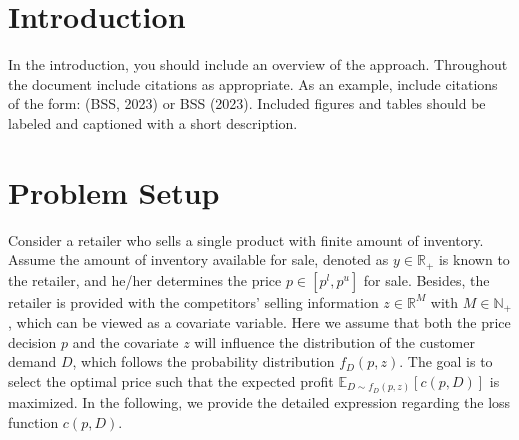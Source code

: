 \documentclass[competition,nonblindrev]{informs3-competition}
\begin{document}







\maketitle

\section{Introduction}

In the introduction, you should include an overview of the approach. Throughout the document include citations as appropriate. As an example, include citations of the form: (BSS, 2023) or BSS (2023). Included figures and tables should be labeled and captioned with a short description.



\section{Problem Setup}
Consider a retailer who sells a single product with finite amount of inventory.
Assume the amount of inventory available for sale, denoted as $y\in\mathbb{R}_+$ is known to the retailer, and he/her determines the price $p\in[p^l, p^u]$ for sale.
Besides, the retailer is provided with the competitors' selling information $z\in \mathbb{R}^{M}$ with $M\in\mathbb{N}_+$, which can be viewed as a covariate variable.
Here we assume that both the price decision $p$ and the covariate $z$ will influence the distribution of the customer demand $D$, which follows the probability distribution $f_D(p, z)$.
The goal is to select the optimal price such that the expected profit $\mathbb{E}_{D\sim f_D(p,z)}[c(p,D)]$ is maximized.
In the following, we provide the detailed expression regarding the loss function $c(p,D)$.
\end{document}
